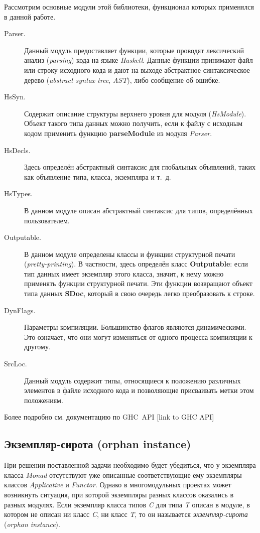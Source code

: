 Рассмотрим основные модули этой библиотеки, функционал которых применялся в данной работе.
\begin{description}
\item[Parser.] Данный модуль предоставляет функции, которые проводят лексический анализ (\textit{parsing}) кода на языке \textit{Haskell}. Данные функции принимают файл или строку исходного кода и дают на выходе абстрактное синтаксическое дерево (\textit{abstract syntax tree}, \textit{AST}), либо сообщение об ошибке.
\item[HsSyn.] Содержит описание структуры верхнего уровня для модуля (\textit{HsModule}). Объект такого типа данных можно получить, если к файлу с исходным кодом применить функцию \textbf{parseModule} из модуля \textit{Parser}.
\item[HsDecls.] Здесь определён абстрактный синтаксис для глобальных объявлений, таких как объявление типа, класса, экземпляра и т.~д.
\item[HsTypes.] В данном модуле описан абстрактный синтаксис для типов, определённых пользователем.
\item[Outputable.] В данном модуле определены классы и функции структурной печати (\textit{pretty-printing}). В частности, здесь определён класс \textbf{Outputable}: если тип данных имеет экземпляр этого класса, значит, к нему можно применять функции структурной печати. Эти функции возвращают объект типа данных \textbf{SDoc}, который в свою очередь легко преобразовать к строке.
\item[DynFlags.] Параметры компиляции. Большинство флагов являются динамическими. Это означает, что они могут изменяться от одного процесса компиляции к другому.
\item[SrcLoc.] Данный модуль содержит типы, относящиеся к положению различных элементов в файле исходного кода и позволяющие присваивать метки этом положениям. 
\end{description}

Более подробно см. документацию по GHC~API [link to GHC API]

\subsection{Экземпляр-сирота (orphan instance)}
При решении поставленной задачи необходимо будет убедиться, что у экземпляра класса \textit{Monad} отсутствуют уже описанные соответствующие ему экземпляры классов \textit{Applicative} и \textit{Functor}. Однако в многомодульных проектах может возникнуть ситуация, при которой экземпляры разных классов оказались в разных модулях. Если экземпляр класса типов \textit{C} для типа \textit{T} описан в модуле, в котором не описан ни класс \textit{C}, ни класс \textit{T}, то он называется \textit{экземпляр-сирота} (\textit{orphan instance}). 

